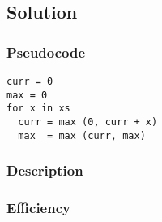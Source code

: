 \subsection*{Solution}

\subsubsection*{Pseudocode}
\begin{verbatim}
curr = 0
max = 0
for x in xs
  curr = max (0, curr + x)
  max  = max (curr, max)
\end{verbatim}

\subsubsection*{Description}

\subsubsection*{Efficiency}
